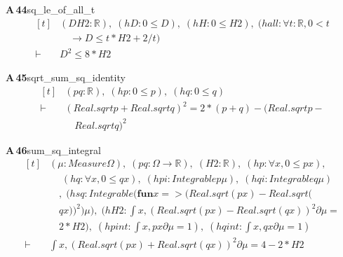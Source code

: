 \documentclass[conference]{IEEEtran}
\theoremstyle{definition}
\newcommand{\lean}[1]{\textsf{\footnotesize #1}}
\begin{document}
\noindent\textbf{A\,44}\quad\lean{sq\_le\_of\_all\_t}
{\footnotesize\[ \begin{aligned}[t]
&(\mathit{D} \mathit{H2} : \mathbb{R} ),\; (\mathit{hD} : 0 \leq \mathit{D}),\; (\mathit{hH} : 0 \leq \mathit{H2}),\; (\mathit{hall} : \forall \mathit{t} : \mathbb{R} , 0 < \mathit{t}\\
&\quad \to \mathit{D} \leq \mathit{t} * \mathit{H2} + 2 / \mathit{t})\\
\vdash\;&\mathit{D} ^{2} \leq 8 * \mathit{H2}
\end{aligned} \]}

\noindent\textbf{A\,45}\quad\lean{sqrt\_sum\_sq\_identity}
{\footnotesize\[ \begin{aligned}[t]
&(\mathit{p} \mathit{q} : \mathbb{R} ),\; (\mathit{hp} : 0 \leq \mathit{p}),\; (\mathit{hq} : 0 \leq \mathit{q})\\
\vdash\;&(\mathit{Real}.\mathit{sqrt} \mathit{p} + \mathit{Real}.\mathit{sqrt} \mathit{q}) ^{2} = 2 * (\mathit{p} + \mathit{q}) - (\mathit{Real}.\mathit{sqrt} \mathit{p} -\\
&\quad \mathit{Real}.\mathit{sqrt} \mathit{q}) ^{2}
\end{aligned} \]}

\noindent\textbf{A\,46}\quad\lean{sum\_sq\_integral}
{\footnotesize\[ \begin{aligned}[t]
&(\mu : \mathit{Measure} \Omega ),\; (\mathit{p} \mathit{q} : \Omega \to \mathbb{R} ),\; (\mathit{H2} : \mathbb{R} ),\; (\mathit{hp} : \forall \mathit{x}, 0 \leq \mathit{p} \mathit{x}),\\
&\quad \; (\mathit{hq} : \forall \mathit{x}, 0 \leq \mathit{q} \mathit{x}),\; (\mathit{hpi} : \mathit{Integrable} \mathit{p} \mu ),\; (\mathit{hqi} : \mathit{Integrable} \mathit{q} \mu )\\
&\quad ,\; (\mathit{hsq} : \mathit{Integrable} (\mathbf{fun} \mathit{x} => (\mathit{Real}.\mathit{sqrt} (\mathit{p} \mathit{x}) - \mathit{Real}.\mathit{sqrt} (\\
&\quad \mathit{q} \mathit{x})) ^{2}) \mu ),\; (\mathit{hH2} : \int \mathit{x}, (\mathit{Real}.\mathit{sqrt} (\mathit{p} \mathit{x}) - \mathit{Real}.\mathit{sqrt} (\mathit{q} \mathit{x})) ^{2} ∂\mu =\\
&\quad 2 * \mathit{H2}),\; (\mathit{hpint} : \int \mathit{x}, \mathit{p} \mathit{x} ∂\mu = 1),\; (\mathit{hqint} : \int \mathit{x}, \mathit{q} \mathit{x} ∂\mu = 1)\\
\vdash\;&\int \mathit{x}, (\mathit{Real}.\mathit{sqrt} (\mathit{p} \mathit{x}) + \mathit{Real}.\mathit{sqrt} (\mathit{q} \mathit{x})) ^{2} ∂\mu = 4 - 2 * \mathit{H2}
\end{aligned} \]}
\end{document}
